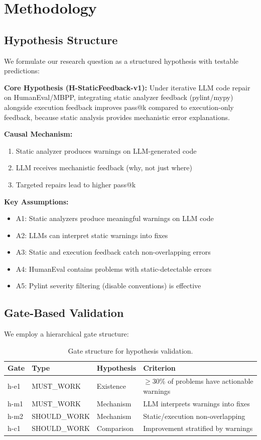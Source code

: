 \section{Methodology}

\subsection{Hypothesis Structure}

We formulate our research question as a structured hypothesis with testable predictions:

\textbf{Core Hypothesis (H-StaticFeedback-v1):} Under iterative LLM code repair on HumanEval/MBPP, integrating static analyzer feedback (pylint/mypy) alongside execution feedback improves pass@k compared to execution-only feedback, because static analysis provides mechanistic error explanations.

\textbf{Causal Mechanism:}
\begin{enumerate}
    \item Static analyzer produces warnings on LLM-generated code
    \item LLM receives mechanistic feedback (why, not just where)
    \item Targeted repairs lead to higher pass@k
\end{enumerate}

\textbf{Key Assumptions:}
\begin{itemize}
    \item A1: Static analyzers produce meaningful warnings on LLM code
    \item A2: LLMs can interpret static warnings into fixes
    \item A3: Static and execution feedback catch non-overlapping errors
    \item A4: HumanEval contains problems with static-detectable errors
    \item A5: Pylint severity filtering (disable conventions) is effective
\end{itemize}

\subsection{Gate-Based Validation}

We employ a hierarchical gate structure:

\begin{table}[h]
\centering
\caption{Gate structure for hypothesis validation.}
\label{tab:gates}
\begin{tabular}{@{}llll@{}}
\toprule
Gate & Type & Hypothesis & Criterion \\
\midrule
h-e1 & MUST\_WORK & Existence & $\geq$30\% of problems have actionable warnings \\
h-m1 & MUST\_WORK & Mechanism & LLM interprets warnings into fixes \\
h-m2 & SHOULD\_WORK & Mechanism & Static/execution non-overlapping \\
h-c1 & SHOULD\_WORK & Comparison & Improvement stratified by warnings \\
\bottomrule
\end{tabular}
\end{table}

